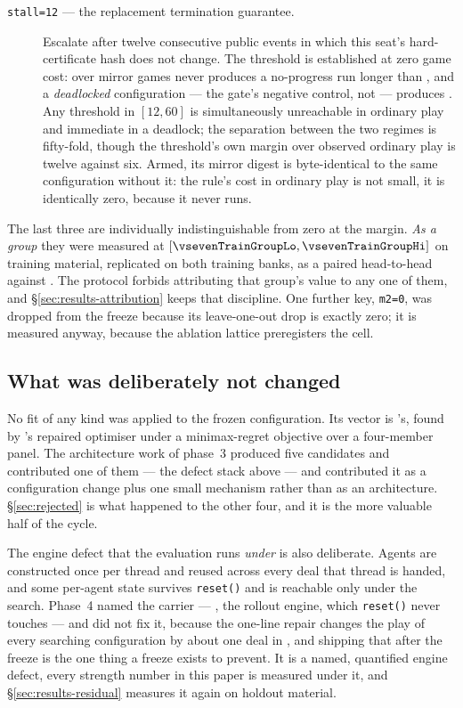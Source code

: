 \begin{description}
\item[\texttt{stall=12} --- the replacement termination guarantee.] Escalate after twelve consecutive
  public events in which this seat's hard-certificate hash does not change. The threshold is established at zero game cost: over \vsevenStallMirrorGames{} mirror games \vsix{} never produces a no-progress run longer than
  \vsevenStallIncumbentRun{}, and a \emph{deadlocked} configuration --- the gate's negative control,
  not \frozen{} --- produces \vsevenStallFrozenRun{}. Any threshold in $[12, 60]$ is simultaneously
  unreachable in ordinary play and immediate in a deadlock; the separation between the two regimes is
  fifty-fold, though the threshold's own margin over observed ordinary play is twelve against six. Armed, its mirror digest is byte-identical to the same configuration
  without it: the rule's cost in ordinary play is not small, it is identically zero, because it never
  runs.

\end{description}

\noindent
The last three are individually indistinguishable from zero at the margin. \emph{As a group} they were
measured at \vsevenTrainGroup{} $[\vsevenTrainGroupLo, \vsevenTrainGroupHi]$ on training material,
replicated on both training banks, as a paired head-to-head against \composite{}. The protocol
forbids attributing that group's value to any one of them, and \S\ref{sec:results-attribution} keeps
that discipline. One further key, \texttt{m2=0}, was dropped from the freeze because its
leave-one-out drop is exactly zero; it is measured anyway, because the ablation lattice preregisters
the cell.

\subsection{What was deliberately not changed}
\label{sec:configuration-notchanged}

No fit of any kind was applied to the frozen configuration. Its vector is \vsix{}'s, found by
\vsix{}'s repaired optimiser under a minimax-regret objective over a four-member panel. The
architecture work of phase~3 produced five candidates and contributed one of them --- the defect
stack above --- and contributed it as a configuration change plus one small mechanism rather than as
an architecture. \S\ref{sec:rejected} is what happened to the other four, and it is the more valuable
half of the cycle.

The engine defect that the evaluation runs \emph{under} is also deliberate. Agents are constructed
once per thread and reused across every deal that thread is handed, and some per-agent state survives
\texttt{reset()} and is reachable only under the search. Phase~4 named the carrier ---
\texttt{\vsevenSsixCarrier{}}, the rollout engine, which \texttt{reset()} never touches --- and did
not fix it, because the one-line repair changes the play of every searching configuration by about one
deal in \vsevenSsixIncidence{}, and shipping that after the freeze is the one thing a freeze exists to
prevent. It is a named, quantified engine defect, every strength number in this paper is measured
under it, and \S\ref{sec:results-residual} measures it again on holdout material.
